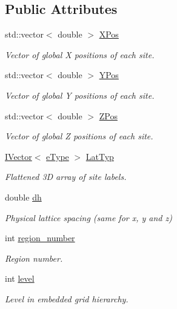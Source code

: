 \subsection*{Public Attributes}
\begin{DoxyCompactItemize}
\item 
std\+::vector$<$ double $>$ \hyperlink{class_grid_obj_af31df133bf9419da6222a0dbb4e54bab}{X\+Pos}
\begin{DoxyCompactList}\small\item\em Vector of global X positions of each site. \end{DoxyCompactList}\item 
std\+::vector$<$ double $>$ \hyperlink{class_grid_obj_a2bd4e9b575377b8e76e5ebe7a3a31194}{Y\+Pos}
\begin{DoxyCompactList}\small\item\em Vector of global Y positions of each site. \end{DoxyCompactList}\item 
std\+::vector$<$ double $>$ \hyperlink{class_grid_obj_af859d35bf0a03cee8965ce3e22e651c6}{Z\+Pos}
\begin{DoxyCompactList}\small\item\em Vector of global Z positions of each site. \end{DoxyCompactList}\item 
\hyperlink{class_i_vector}{I\+Vector}$<$ \hyperlink{_enumerations_8h_a12f8ec8f0e7a4584b9fe481bb53fa60e}{e\+Type} $>$ \hyperlink{class_grid_obj_a8ce077fba648f767361039eb924c45ae}{Lat\+Typ}
\begin{DoxyCompactList}\small\item\em Flattened 3D array of site labels. \end{DoxyCompactList}\item 
double \hyperlink{class_grid_obj_a4efe4f79d600da2f459a0cc08b89b40c}{dh}
\begin{DoxyCompactList}\small\item\em Physical lattice spacing (same for x, y and z) \end{DoxyCompactList}\item 
int \hyperlink{class_grid_obj_ae0b724f2d977cfe38df2bb191e2fb042}{region\+\_\+number}
\begin{DoxyCompactList}\small\item\em Region number. \end{DoxyCompactList}\item 
int \hyperlink{class_grid_obj_a7dfedc4442a386ec15c8b03ca899c1a9}{level}
\begin{DoxyCompactList}\small\item\em Level in embedded grid hierarchy. \end{DoxyCompactList}\item 

\end{DoxyCompactItemize}
